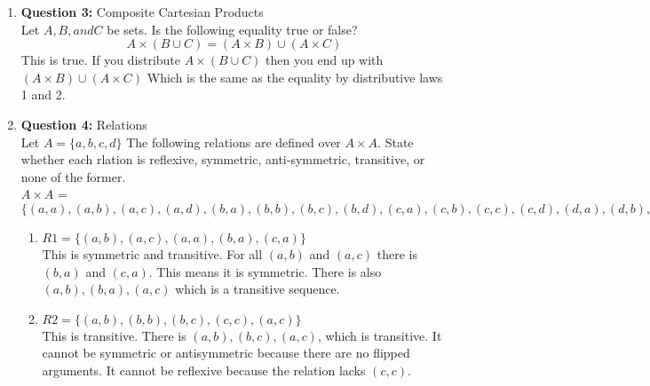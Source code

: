 \documentclass[11pt]{article}
\begin{document}
\begin{enumerate}
\begin{enumerate}[label=(\alph*)]
    \item 
    $C \times A$ = $\{(True, 1), (True, 2), (True, 3), (True, 4), (False, 1), (False, 2), (False, 3), (False, 4)\} $
    \item 
    $B \times B$ = $\{(a,a),(a,b),(a,c),(b,a),(b,b),(b,c),(c,a),(c,b),(c,c)\}$
    \item 
    $B \times A \times C$ = $\{(a,1,True), (a,2, True), (a, 3, True), (a, 4, True), (a, 1, False), (a, 2, False), (a, 3, False), \\ (a, 4, False), (b,1,True), (b,2, True), (b, 3, True), (b, 4, True), (b, 1, False), (b, 2, False), (b, 3, False), \\ (b, 4, False), (c,1,True), (c,2, True), (c, 3, True), (c, 4, True), (c, 1, False), (c, 2, False), (c, 3, False), \\ (c, 4, False)\}$
\end{enumerate}
\item
\textbf{Question 3:} Composite Cartesian Products \\
Let $A, B, and C$ be sets. Is the following equality true or false?
\begin{equation*}
    A \times (B \cup C) = (A \times B) \cup (A \times C)
\end{equation*}
This is true. If you distribute $A \times (B \cup C)$ then you end up with $(A \times B) \cup (A \times C)$ Which is the same as the equality by distributive laws 1 and 2. 
\item
\textbf{Question 4:} Relations \\
Let $A = \{a,b,c,d\}$ The following relations are defined over $A \times A$. State whether each rlation is reflexive, symmetric, anti-symmetric, transitive, or none of the former. \\
$A \times A$ = $\{(a,a),(a,b),(a,c),(a,d),(b,a),(b,b),(b,c),(b,d),(c,a),(c,b),(c,c),(c,d),(d,a),(d,b),(d,c),(d,d)\}$
\begin{enumerate}[label=(\alph*)]
    \item 
    $R1 = \{(a,b),(a,c),(a,a),(b,a),(c,a)\}$\\
    This is symmetric and transitive. For all $(a,b)$ and $(a,c)$ there is $(b,a)$ and $(c,a)$. This means it is symmetric. There is also $(a,b), (b,a),(a,c)$ which is a transitive sequence.
    \item 
    $R2 = \{(a,b),(b,b),(b,c),(c,c),(a,c)\}$ \\
    This is transitive. There is $(a,b),(b,c),(a,c)$, which is transitive. It cannot be symmetric or antisymmetric because there are no flipped arguments. It cannot be reflexive because the relation lacks $(c,c)$.

\end{enumerate}
\end{enumerate}
\end{document}
